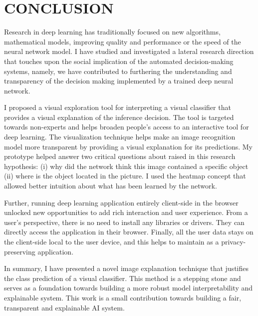 %
%

\chapter{CONCLUSION}
\thispagestyle{empty}




Research in deep learning has traditionally focused on new algorithms, mathematical models, improving quality and performance or the speed of the neural network model. I have studied and investigated a lateral research direction that touches upon the social implication of the automated decision-making systems, namely, we have contributed to furthering the understanding and transparency of the decision making implemented by a trained deep neural network. 

I proposed a visual exploration tool for interpreting a visual classifier that provides a visual explanation of the inference decision. The tool is targeted towards non-experts and helps broaden people's access to an interactive tool for deep learning. The visualization technique helps make an image recognition model more transparent by providing a visual explanation for its predictions. My prototype helped answer two critical questions about raised in this research hypothesis: (i) why did the network think this image contained a specific object (ii) where is the object located in the picture. I used the heatmap concept that allowed better intuition about what has been learned by the network.

Further, running deep learning application entirely client-side in the browser unlocked new opportunities to add rich interaction and user experience. From a user's perspective, there is no need to install any libraries or drivers. They can directly access the application in their browser. Finally, all the user data stays on the client-side local to the user device, and this helps to maintain as a privacy-preserving application.

In summary, I have presented a novel image explanation technique that justifies the class prediction of a visual classifier. This method is a stepping stone and serves as a foundation towards building a more robust model interpretability and explainable system. This work is a small contribution towards building a fair, transparent and explainable AI system.